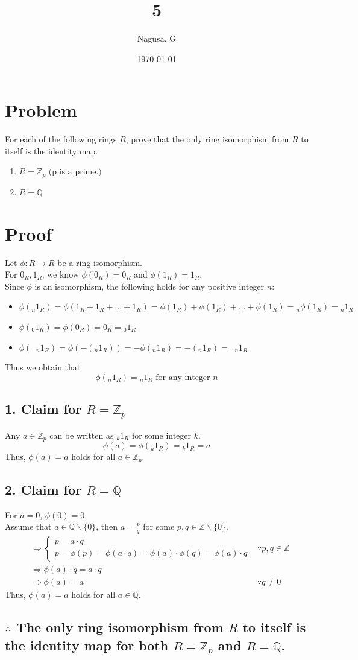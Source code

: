 \documentclass[11pt, a4paper]{article}
\title{5}
\author{Nagusa, G}
\date{\today}
\begin{document}
\maketitle


\section*{Problem}
For each of the following rings $R$,
prove that the only ring isomorphism from $R$ to itself is the identity map.
\begin{enumerate}
    \item $R=\mathbb{Z}_p \text{ (p is a prime.) }$
    \item $R=\mathbb{Q}$
\end{enumerate}

\section*{Proof}
Let $\phi : R \to R$ be a ring isomorphism.\\
For $0_R, 1_R$, we know $\phi(0_R) = 0_R$ and $\phi(1_R) = 1_R$.\\
Since $\phi$ is an isomorphism, the following holds for any positive integer $n$:
\begin{itemize}
    \item $\phi({}_n 1_R) = \phi(1_R + 1_R + ... + 1_R) = \phi(1_R) + \phi(1_R) + ... + \phi(1_R) = {}_n \phi(1_R) = {}_n 1_R$
    \item $\phi({}_0 1_R) = \phi(0_R) = 0_R = {}_0 1_R$
    \item $\phi({}_{-n} 1_R) = \phi(-({}_n 1_R)) = -\phi({}_n 1_R) = -({}_n 1_R) = {}_{-n} 1_R$
\end{itemize}
Thus we obtain that
\[
\phi({}_{n} 1_R) = {}_{n} 1_R \text{ for any integer } n
\]

\subsection*{1. Claim for $R=\mathbb{Z}_p$}
Any $a \in \mathbb{Z}_p$ can be written as ${}_k 1_R$ for some integer $k$.
\[
\phi(a) = \phi({}_k 1_R)= {}_k 1_R = a
\]
Thus, $\phi(a) = a$ holds for all $a \in \mathbb{Z}_p$.

\subsection*{2. Claim for $R=\mathbb{Q}$}
For $a=0$, $\phi(0)=0$.\\
Assume that $a\in \mathbb{Q}\backslash\{0\}$, then $a = \frac{p}{q}$ for some $p, q \in \mathbb{Z}\backslash\{0\}$.
\begin{align*}
    &\Rightarrow
    \begin{cases}
        p = a \cdot q\\
        p = \phi(p) = \phi(a \cdot q) = \phi(a) \cdot \phi(q) = \phi(a) \cdot q
    \end{cases} &\because p,q \in \mathbb{Z}\\
    &\Rightarrow \phi(a) \cdot q = a \cdot q\\
    &\Rightarrow \phi(a) = a &\because q\neq 0
\end{align*}
Thus, $\phi(a) = a$ holds for all $a \in \mathbb{Q}$.

\subsection*{$\therefore$ The only ring isomorphism from $R$ to itself is the identity map for both $R=\mathbb{Z}_p$ and $R=\mathbb{Q}$.}
\end{document}
